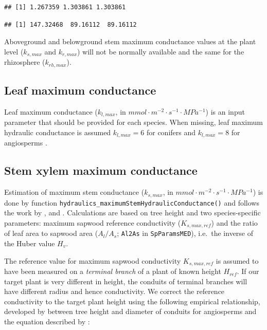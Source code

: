 \documentclass[]{book}
\newenvironment{Shaded}{\begin{snugshade}}{\end{snugshade}}
\newcommand{\OperatorTok}[1]{\textcolor[rgb]{0.81,0.36,0.00}{\textbf{#1}}}
\newcommand{\NormalTok}[1]{#1}
\begin{document}
\begin{verbatim}
## [1] 1.267359 1.303861 1.303861
\end{verbatim}

\begin{Shaded}
\end{Shaded}

\begin{verbatim}
## [1] 147.32468  89.16112  89.16112
\end{verbatim}

Aboveground and belowground stem maximum conductance values at the plant
level (\(k_{s, max}\) and \(k_{r, max}\)) will not be normally available
and the same for the rhizosphere (\(k_{rh, max}\)).

\subsection{Leaf maximum conductance}\label{leaf-maximum-conductance}

Leaf maximum conductance (\(k_{l, max}\), in
\(mmol \cdot m^{-2} \cdot s^{-1} \cdot MPa^{-1}\)) is an input parameter
that should be provided for each species. When missing, leaf maximum
hydraulic conductance is assumed \(k_{l, max}=6\) for conifers and
\(k_{l, max}=8\) for angiosperms \citep{Sack2006}.

\subsection{Stem xylem maximum
conductance}\label{stem-xylem-maximum-conductance}

Estimation of maximum stem conductance (\(k_{s,max}\), in
\(mmol \cdot m^{-2} \cdot s^{-1} \cdot MPa^{-1}\)) is done by function
\texttt{hydraulics\_maximumStemHydraulicConductance()} and follows the
work by \citet{Savage2010}, \citet{Olson2014} and
\citet{Christoffersen2016}. Calculations are based on tree height and
two species-specific parameters: maximum sapwood reference conductivity
(\(K_{s,max,ref}\)) and the ratio of leaf area to sapwood area
(\(A_{l}/A_{s}\); \texttt{Al2As} in \texttt{SpParamsMED}), i.e.~the
inverse of the Huber value \(H_v\).

The reference value for maximum sapwood conductivity \(K_{s,max,ref}\)
is assumed to have been measured on a \emph{terminal branch} of a plant
of known height \(H_{ref}\). If our target plant is very different in
height, the conduits of terminal branches will have different radius and
hence conductivity. We correct the reference conductivity to the target
plant height using the following empirical relationship, developed by
\citet{Olson2014} between tree height and diameter of conduits for
angiosperms and the equation described by \citet{Christoffersen2016}:
\end{document}

